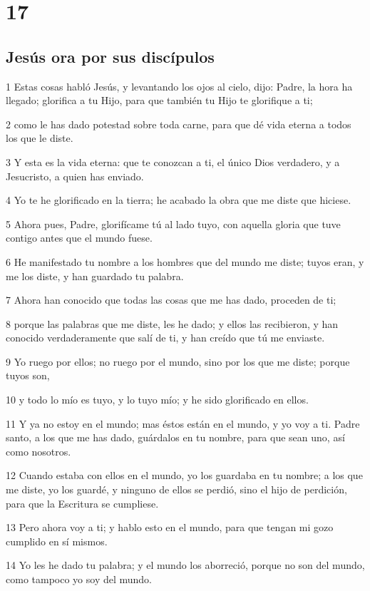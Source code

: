 \chapter{17}

\section*{Jesús ora por sus discípulos}

\par 1 Estas cosas habló Jesús, y levantando los ojos al cielo, dijo: Padre, la hora ha llegado; glorifica a tu Hijo, para que también tu Hijo te glorifique a ti;
\par 2 como le has dado potestad sobre toda carne, para que dé vida eterna a todos los que le diste.
\par 3 Y esta es la vida eterna: que te conozcan a ti, el único Dios verdadero, y a Jesucristo, a quien has enviado.
\par 4 Yo te he glorificado en la tierra; he acabado la obra que me diste que hiciese.
\par 5 Ahora pues, Padre, glorifícame tú al lado tuyo, con aquella gloria que tuve contigo antes que el mundo fuese.
\par 6 He manifestado tu nombre a los hombres que del mundo me diste; tuyos eran, y me los diste, y han guardado tu palabra.
\par 7 Ahora han conocido que todas las cosas que me has dado, proceden de ti;
\par 8 porque las palabras que me diste, les he dado; y ellos las recibieron, y han conocido verdaderamente que salí de ti, y han creído que tú me enviaste.
\par 9 Yo ruego por ellos; no ruego por el mundo, sino por los que me diste; porque tuyos son,
\par 10 y todo lo mío es tuyo, y lo tuyo mío; y he sido glorificado en ellos.
\par 11 Y ya no estoy en el mundo; mas éstos están en el mundo, y yo voy a ti. Padre santo, a los que me has dado, guárdalos en tu nombre, para que sean uno, así como nosotros.
\par 12 Cuando estaba con ellos en el mundo, yo los guardaba en tu nombre; a los que me diste, yo los guardé, y ninguno de ellos se perdió, sino el hijo de perdición, para que la Escritura se cumpliese.
\par 13 Pero ahora voy a ti; y hablo esto en el mundo, para que tengan mi gozo cumplido en sí mismos.
\par 14 Yo les he dado tu palabra; y el mundo los aborreció, porque no son del mundo, como tampoco yo soy del mundo.
